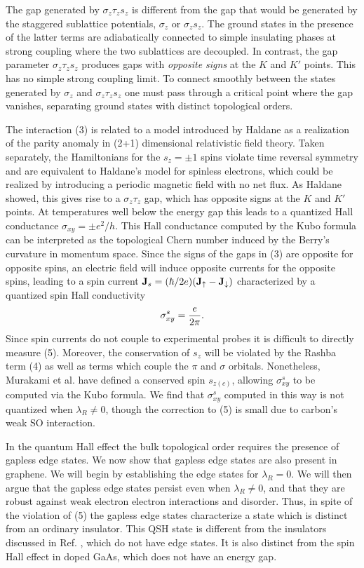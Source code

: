 \documentclass[twocolumn,showpacs,floatfix,prl]{revtex4}
\begin{document}
The  gap generated by $\sigma_z\tau_z s_z$ is different from the gap that
would be generated by the staggered sublattice potentials,
$\sigma_z$ or $\sigma_z s_z$.  The ground states in the presence
of the latter terms are adiabatically connected to simple
insulating phases at strong coupling where the two sublattices
are decoupled. In contrast, the gap parameter  $\sigma_z \tau_z
s_z$ produces gaps with {\it opposite signs} at the $K$ and $K'$
points. This has no simple strong coupling limit. To connect
smoothly between the states generated by $\sigma_z$ and
$\sigma_z\tau_z s_z$ one must pass through a critical point where
the gap vanishes,
separating ground states with distinct topological orders.

The interaction (3) is related to a model introduced by Haldane\cite{haldane1}
 as a realization
of the parity anomaly in (2+1) dimensional relativistic field
theory. Taken separately, the Hamiltonians for the $s_z=\pm 1$
spins violate time reversal symmetry and are equivalent to
Haldane's model for spinless electrons, which could be realized
by introducing a periodic magnetic field with no net flux.  As
Haldane showed, this gives rise to a $\sigma_z\tau_z$ gap, which
has opposite signs at the $K$ and $K'$ points.  At temperatures
well below the energy gap this leads to a quantized Hall
conductance $\sigma_{xy} = \pm e^2/h$.  This Hall
conductance computed by the Kubo formula can be interpreted as the
topological Chern number
induced by the Berry's curvature in momentum
space\cite{thouless,haldane2}. Since the signs of the gaps in (3)
are opposite for opposite spins, an electric field will induce
opposite currents for the opposite spins, leading to a spin
current ${\bf J}_s = (\hbar/2e)({\bf J}_\uparrow-{\bf
J}_\downarrow)$ characterized by a quantized spin Hall
conductivity
\begin{equation}
\sigma^s_{xy}={e\over{2\pi}}.
\end{equation}
Since spin currents do not couple to experimental probes it is difficult
to directly measure (5).  Moreover, the conservation of $s_z$ will be violated
by the Rashba term (4) as well as terms which couple the $\pi$ and
$\sigma$ orbitals.  Nonetheless, Murakami et al. \cite{murakami3} have
defined a conserved spin $s_{z(c)}$, allowing $\sigma_{xy}^s$ to be computed
via the Kubo formula.  We find that $\sigma_{xy}^s$ computed in this way
is not quantized when $\lambda_R\ne 0$, though the correction
to (5) is small due to carbon's weak SO interaction.

In the quantum Hall effect the bulk topological order requires the
presence of gapless edge states.  We now show that gapless edge
states are also present in graphene.
We will begin by establishing the edge states for $\lambda_R=0$.  We
will then argue that the gapless edge states persist even when $\lambda_R \ne
0$, and that they are robust against weak electron electron interactions and
disorder.  Thus, in spite of the violation of (5) the gapless edge states
characterize a state which is distinct from an ordinary insulator.
This QSH state is different from the insulators discussed in
Ref. , which do not have edge states.  It is also distinct from
the spin Hall effect in doped GaAs, which does not have an energy gap.
\end{document}
